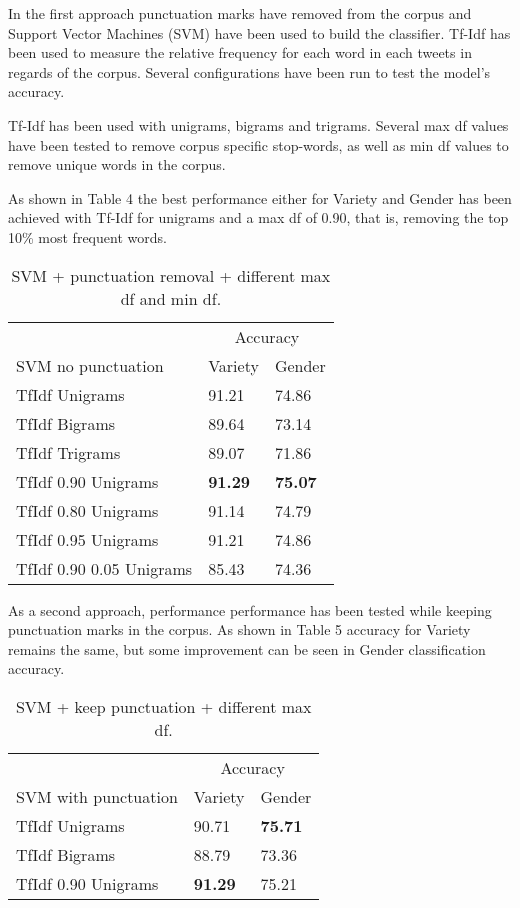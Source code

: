 \documentclass[11pt,a4paper]{article}
\begin{document}
In the first approach punctuation marks have removed from the corpus and Support Vector Machines (SVM) have been used to build the classifier. Tf-Idf has been used to measure the relative frequency for each word in each tweets in regards of the corpus. Several configurations have been run to test the model's accuracy.

Tf-Idf has been used with unigrams, bigrams and trigrams. Several max df values have been tested to remove corpus specific stop-words, as well as min df values to remove unique words in the corpus.

As shown in Table 4 the best performance either for Variety and Gender has been achieved with Tf-Idf for unigrams and a max df of 0.90, that is, removing the top 10\% most frequent words.

\begin{table}[htbp]
\begin{center}
\begin{tabular}{|l|l|l|}
\hline
& \multicolumn{2}{c|}{Accuracy} \\
\cline{2-3}
SVM no punctuation & Variety & Gender \\
\hline \hline
TfIdf Unigrams & 91.21 & 74.86 \\ \hline
TfIdf Bigrams & 89.64 & 73.14 \\ \hline
TfIdf Trigrams & 89.07 & 71.86 \\ \hline
TfIdf 0.90 Unigrams & \textbf{91.29} & \textbf{75.07} \\ \hline
TfIdf 0.80 Unigrams & 91.14 & 74.79 \\ \hline
TfIdf 0.95 Unigrams & 91.21 & 74.86 \\ \hline
TfIdf 0.90 0.05 Unigrams & 85.43 & 74.36 \\ \hline
\end{tabular}
\caption{SVM + punctuation removal + different max df and min df.}
\label{tabla:sencilla}
\end{center}
\end{table}

As a second approach, performance performance has been tested while keeping punctuation marks in the corpus. As shown in Table 5 accuracy for Variety remains the same, but some improvement can be seen in Gender classification accuracy.

\begin{table}[htbp]
\begin{center}
\begin{tabular}{|l|l|l|}
\hline
& \multicolumn{2}{c|}{Accuracy} \\
\cline{2-3}
SVM with punctuation & Variety & Gender \\
\hline \hline
TfIdf Unigrams & 90.71 & \textbf{75.71} \\ \hline
TfIdf Bigrams & 88.79 & 73.36 \\ \hline
TfIdf 0.90 Unigrams & \textbf{91.29} & 75.21 \\ \hline
\end{tabular}
\caption{SVM + keep punctuation + different max df.}
\label{tabla:sencilla}
\end{center}
\end{table}
\end{document}
